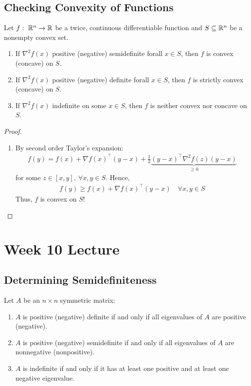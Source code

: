 \documentclass[11pt]{article}
\numberwithin{equation}{section}
\begin{document}
\subsection{Checking Convexity of Functions}
\begin{proposition}
    Let $f: \ \mathbb R^n \rightarrow \mathbb R$ be a twice, continuous differentiable function and $S \subseteq \mathbb R^n$ be a nonempty convex set.\begin{enumerate}
        \item If $\nabla^2 f(x)$ positive (negative) semidefinite forall $x \in S$, then $f$ is convex (concave) on $S$.
        \item If $\nabla^2 f(x)$ positive (negative) definite forall $x \in S$, then $f$ is strictly convex (concave) on $S$.
        \item If $\nabla^2 f(x)$ indefinite on some $x \in S$, then $f$ is neither convex nor concave on $S$.
    \end{enumerate}
    \begin{proof}
        \begin{enumerate}
            \item By second order Taylor's expansion:\begin{align*}
                f(y)=f(x) + \nabla f(x)^\top (y-x) + \frac{1}{2}\underbrace{(y-x)^\top \nabla^2 f(z)(y-x)}_{\geq 0}
            \end{align*} for some $z\in \left[ x,y \right], \ \forall x,y \in S$.
            Hence,\begin{align*}
                f(y) \geq f(x) + \nabla f(x)^\top (y-x) \quad \forall x,y \in S
            \end{align*}
            Thus, $f$ is convex on $S$!
        \end{enumerate}
    \end{proof}
\end{proposition}

\newpage
\section{Week 10 Lecture}
\subsection{Determining Semidefiniteness}
\begin{proposition}
    Let $A$ be an $n \times n$ symmetric matrix:\begin{enumerate}
        \item $A$ is positive (negative) definite if and only if all eigenvalues of $A$ are positive (negative).
        \item $A$ is positive (negative) semidefinite if and only if all eigenvalues of $A$ are nonnegative (nonpositive).
        \item $A$ is indefinite if and only if it has at least one positive and at least one negative eigenvalue.
    \end{enumerate}
\end{proposition}
\end{document}
